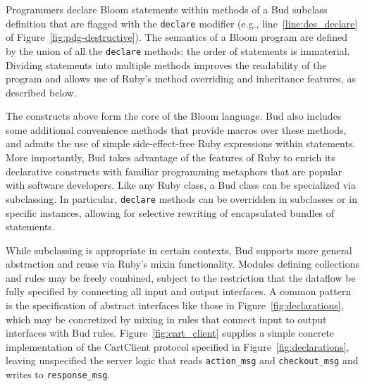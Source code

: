 Programmers declare Bloom statements within methods of a Bud subclass
definition that are flagged with the \texttt{declare} modifier (e.g.,
line~\ref{line:des_declare} of Figure~\ref{fig:pdg-destructive}). The semantics
of a Bloom program are defined by the union of all the \texttt{declare}
methods; the order of statements is immaterial. Dividing statements into multiple
methods improves the readability of the program and allows use of Ruby's method
overriding and inheritance features, as described below.


The constructs above form the core of the Bloom language.
Bud also includes some additional convenience methods that provide macros over these methods, and admits the use of simple side-effect-free Ruby expressions within statements.  More importantly, Bud takes advantage of the features of Ruby to enrich its declarative constructs with familiar programming metaphors that are popular with software developers.  Like any Ruby class, a Bud class can be specialized via subclassing.  In particular, \texttt{declare} methods can be overridden in subclasses or in specific instances, allowing for selective rewriting of encapsulated bundles of statements.%

While subclassing is appropriate in certain contexts, Bud supports more general abstraction and reuse via 
Ruby's mixin functionality.  Modules defining collections and rules may be freely combined, subject to the restriction
that the dataflow be fully specified by connecting all input and output interfaces.  A common pattern is the
specification of abstract interfaces like those in Figure~\ref{fig:declarations}, which may be concretized by 
mixing in rules that connect input to output interfaces with Bud rules.  Figure~\ref{fig:cart_client} supplies
a simple concrete implementation of the CartClient protocol specified in Figure~\ref{fig:declarations}, leaving
unspecified the server logic that reads \texttt{action\_msg} and \texttt{checkout\_msg} and writes to
\texttt{response\_msg}.


